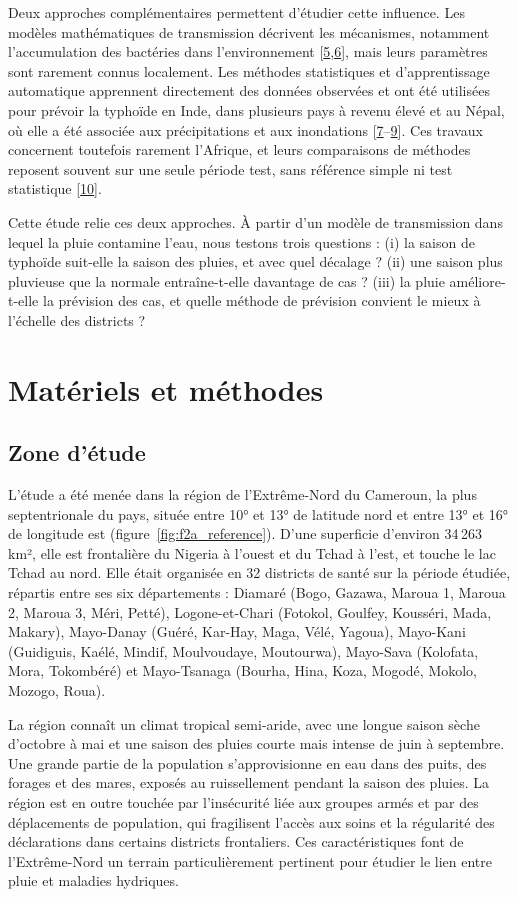 \documentclass[11pt]{article}
\begin{document}
Deux approches complémentaires permettent d'étudier cette influence. Les modèles mathématiques de transmission décrivent les mécanismes, notamment l'accumulation des bactéries dans l'environnement [\hyperlink{ref5}{5},\hyperlink{ref6}{6}], mais leurs paramètres sont rarement connus localement. Les méthodes statistiques et d'apprentissage automatique apprennent directement des données observées et ont été utilisées pour prévoir la typhoïde en Inde, dans plusieurs pays à revenu élevé et au Népal, où elle a été associée aux précipitations et aux inondations [\hyperlink{ref7}{7}--\hyperlink{ref9}{9}]. Ces travaux concernent toutefois rarement l'Afrique, et leurs comparaisons de méthodes reposent souvent sur une seule période test, sans référence simple ni test statistique [\hyperlink{ref10}{10}].

Cette étude relie ces deux approches. À partir d'un modèle de transmission dans lequel la pluie contamine l'eau, nous testons trois questions : (i) la saison de typhoïde suit-elle la saison des pluies, et avec quel décalage ? (ii) une saison plus pluvieuse que la normale entraîne-t-elle davantage de cas ? (iii) la pluie améliore-t-elle la prévision des cas, et quelle méthode de prévision convient le mieux à l'échelle des districts ?

\section{Matériels et méthodes}
\subsection{Zone d'étude}
L'étude a été menée dans la région de l'Extrême-Nord du Cameroun, la plus septentrionale du pays, située entre 10° et 13° de latitude nord et entre 13° et 16° de longitude est (figure~\ref{fig:f2a_reference}). D'une superficie d'environ 34\,263 km², elle est frontalière du Nigeria à l'ouest et du Tchad à l'est, et touche le lac Tchad au nord. Elle était organisée en 32 districts de santé sur la période étudiée, répartis entre ses six départements : Diamaré (Bogo, Gazawa, Maroua 1, Maroua 2, Maroua 3, Méri, Petté), Logone-et-Chari (Fotokol, Goulfey, Kousséri, Mada, Makary), Mayo-Danay (Guéré, Kar-Hay, Maga, Vélé, Yagoua), Mayo-Kani (Guidiguis, Kaélé, Mindif, Moulvoudaye, Moutourwa), Mayo-Sava (Kolofata, Mora, Tokombéré) et Mayo-Tsanaga (Bourha, Hina, Koza, Mogodé, Mokolo, Mozogo, Roua).

La région connaît un climat tropical semi-aride, avec une longue saison sèche d'octobre à mai et une saison des pluies courte mais intense de juin à septembre. Une grande partie de la population s'approvisionne en eau dans des puits, des forages et des mares, exposés au ruissellement pendant la saison des pluies. La région est en outre touchée par l'insécurité liée aux groupes armés et par des déplacements de population, qui fragilisent l'accès aux soins et la régularité des déclarations dans certains districts frontaliers. Ces caractéristiques font de l'Extrême-Nord un terrain particulièrement pertinent pour étudier le lien entre pluie et maladies hydriques.
\end{document}
